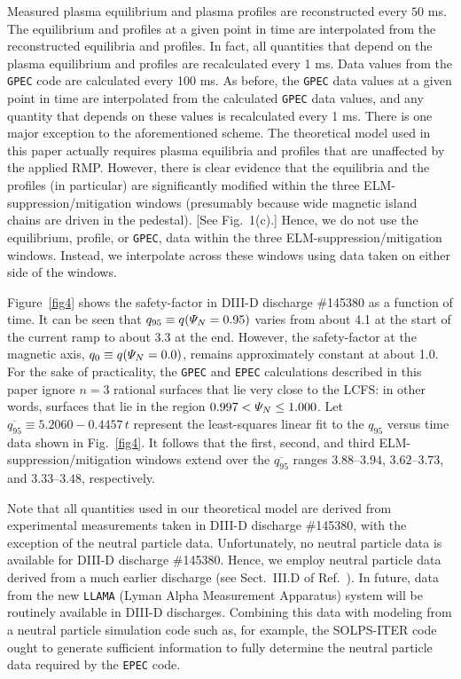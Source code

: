 \documentclass[12pt,prb,aps]{revtex4-1}
\begin{document}
Measured plasma equilibrium and
plasma profiles are reconstructed every $50$ ms. The equilibrium and profiles  at a given point in time are interpolated from
the reconstructed equilibria and profiles. In fact, all quantities that depend on the plasma equilibrium and profiles are recalculated every 1 ms.  Data values from the
{\tt GPEC} code are calculated every 100 ms. As before, the {\tt GPEC} data values at a given point in time are interpolated from the
calculated {\tt GPEC} data values, and any quantity that depends on these values is recalculated every 1 ms. There is one major exception to
the aforementioned scheme. The theoretical model used in this paper actually requires plasma equilibria and profiles that are unaffected
by the applied RMP. However, there is clear evidence that the equilibria and the profiles (in particular) are significantly modified
within the three ELM-suppression/mitigation windows (presumably because wide magnetic island chains are driven in the pedestal). [See Fig.~1(c).]
Hence, we do not use the equilibrium, profile, or {\tt GPEC}, data within the three ELM-suppression/mitigation windows. Instead, we
interpolate across these windows using data taken on either side of the windows. 

Figure~\ref{fig4} shows the safety-factor in DIII-D discharge \#145380 as a function of time. It can be seen
that $q_{95}\equiv q({\mit\Psi}_N=0.95)$ varies from about 4.1 at the start of the current ramp to about 3.3
at the end. However, the safety-factor at the magnetic axis, $q_0 \equiv q({\mit\Psi}_N=0.0)$, remains approximately
constant at about 1.0. For the sake of practicality,  the {\tt GPEC} and {\tt EPEC} calculations described in this paper ignore $n=3$ rational
surfaces that lie very close to the LCFS: in other words,  surfaces that lie in the region $0.997 < {\mit\Psi}_N\leq 1.000$. Let $\overline{q_{95}}\equiv 5.2060-0.4457\,t$ represent the
least-squares linear fit to the $q_{95}$ versus time data shown in Fig.~\ref{fig4}. 
It follows that the 
first, second, and third ELM-suppression/mitigation windows extend over the $\overline{q_{95}}$ ranges $3.88$--$3.94$, $3.62$--$3.73$,
and $3.33$--$3.48$, respectively. 

Note that all quantities used in our theoretical model are derived from experimental measurements taken in DIII-D discharge \#145380, with the exception of the neutral particle data. 
Unfortunately, no neutral particle data is available for DIII-D discharge \#145380.
Hence, we employ neutral particle data derived from a much earlier discharge (see Sect.~III.D of Ref.~).\cite{neutral}
In future, data from the new {\tt LLAMA} (Lyman Alpha Measurement Apparatus) system will be routinely available in DIII-D discharges.\cite{llama}
Combining this data  with modeling from a neutral particle simulation code such as, for example, the  SOLPS-ITER code\,\cite{solps} ought to generate sufficient information to fully determine the
neutral particle data required by the {\tt EPEC} code.  
\end{document}
